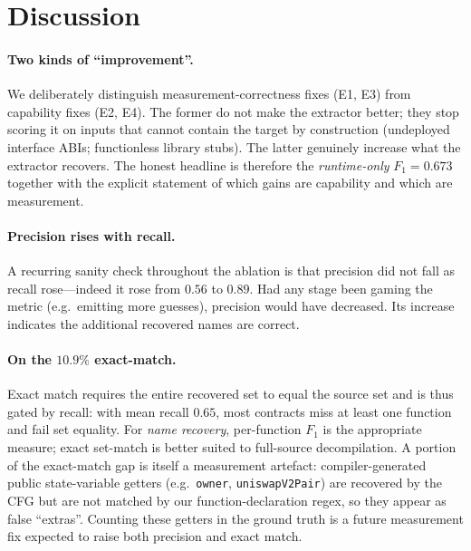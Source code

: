 \documentclass[10pt,conference]{article}
\begin{document}
\section{Discussion}

\paragraph{Two kinds of ``improvement''.}
We deliberately distinguish measurement-correctness fixes (E1, E3) from
capability fixes (E2, E4). The former do not make the extractor better; they stop
scoring it on inputs that cannot contain the target by construction (undeployed
interface ABIs; functionless library stubs). The latter genuinely increase what
the extractor recovers. The honest headline is therefore the \emph{runtime-only}
$F_1=0.673$ together with the explicit statement of which gains are capability
and which are measurement.

\paragraph{Precision rises with recall.}
A recurring sanity check throughout the ablation is that precision did not fall
as recall rose---indeed it rose from $0.56$ to $0.89$. Had any stage been gaming
the metric (e.g.\ emitting more guesses), precision would have decreased. Its
increase indicates the additional recovered names are correct.

\paragraph{On the $10.9\%$ exact-match.}
Exact match requires the entire recovered set to equal the source set and is thus
gated by recall: with mean recall $0.65$, most contracts miss at least one
function and fail set equality. For \emph{name recovery}, per-function $F_1$ is
the appropriate measure; exact set-match is better suited to full-source
decompilation. A portion of the exact-match gap is itself a measurement artefact:
compiler-generated public state-variable getters (e.g.\ \texttt{owner},
\texttt{uniswapV2Pair}) are recovered by the CFG but are not matched by our
function-declaration regex, so they appear as false ``extras''. Counting these
getters in the ground truth is a future measurement fix expected to raise both
precision and exact match.

\end{document}
